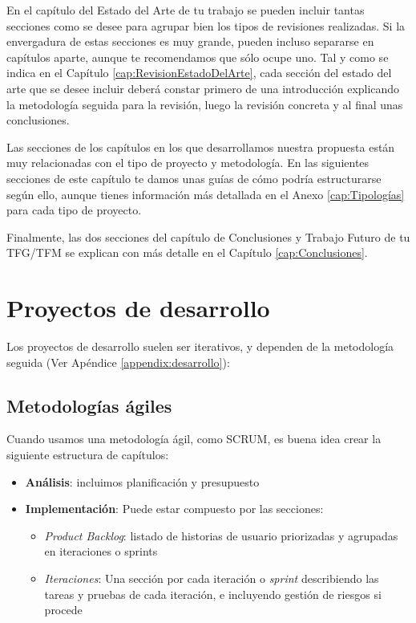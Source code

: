 En el capítulo del Estado del Arte de tu trabajo se pueden incluir tantas secciones como se desee para agrupar bien los tipos de revisiones realizadas. Si la envergadura de estas secciones es muy grande, pueden incluso separarse en capítulos aparte, aunque te recomendamos que sólo ocupe uno. Tal y como se indica en el Capítulo \ref{cap:RevisionEstadoDelArte}, cada sección del estado del arte que se desee incluir deberá constar primero de una introducción explicando la metodología seguida para la revisión, luego la revisión concreta y al final unas conclusiones. %

Las secciones de los capítulos en los que desarrollamos nuestra propuesta están muy relacionadas con el tipo de proyecto y metodología. En las siguientes secciones de este capítulo te damos unas guías de cómo podría estructurarse según ello, aunque tienes información más detallada en el Anexo \ref{cap:Tipologías} para cada tipo de proyecto.

Finalmente, las dos secciones del capítulo de Conclusiones y Trabajo Futuro de tu TFG/TFM se explican con más detalle en el Capítulo \ref{cap:Conclusiones}.



\section{Proyectos de desarrollo}

Los proyectos de desarrollo suelen ser iterativos, y dependen de la metodología seguida (Ver Apéndice \ref{appendix:desarrollo}):

\subsection{Metodologías ágiles}

Cuando usamos una metodología ágil, como SCRUM, es buena idea crear la siguiente estructura de capítulos:
\begin{itemize}
    \item \textbf{Análisis}: incluimos planificación y presupuesto
    \item \textbf{Implementación}: Puede estar compuesto por las secciones:
    \begin{itemize}
                    \item \textit{Product Backlog}: listado de historias de usuario priorizadas y agrupadas en iteraciones o sprints
                    \item \textit{Iteraciones}: Una sección por cada iteración o \textit{sprint} describiendo las tareas y pruebas de cada iteración, e incluyendo gestión de riesgos si procede
                \end{itemize}
\end{itemize}
                

